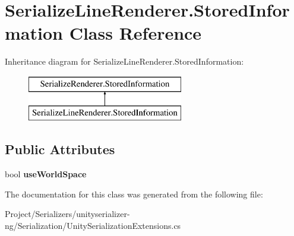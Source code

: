 \hypertarget{class_serialize_line_renderer_1_1_stored_information}{}\section{Serialize\+Line\+Renderer.\+Stored\+Information Class Reference}
\label{class_serialize_line_renderer_1_1_stored_information}
Inheritance diagram for Serialize\+Line\+Renderer.\+Stored\+Information\+:\begin{figure}[H]
\begin{center}
\leavevmode
\includegraphics[height=2.000000cm]{class_serialize_line_renderer_1_1_stored_information}
\end{center}
\end{figure}
\subsection*{Public Attributes}
\begin{DoxyCompactItemize}
\item 
\mbox{\label{class_serialize_line_renderer_1_1_stored_information_aba7c4f96fcbcc3232ab5a7a1f9a6130c}} 
bool {\bfseries use\+World\+Space}
\end{DoxyCompactItemize}


The documentation for this class was generated from the following file\+:\begin{DoxyCompactItemize}
\item 
Project/\+Serializers/unityserializer-\/ng/\+Serialization/Unity\+Serialization\+Extensions.\+cs\end{DoxyCompactItemize}
